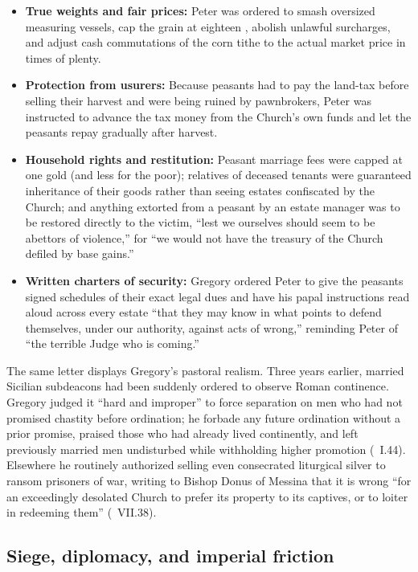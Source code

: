 \begin{itemize}
\item \textbf{True weights and fair prices:} Peter was ordered to smash
oversized measuring vessels, cap the grain  at eighteen
, abolish unlawful surcharges, and adjust cash commutations of
the corn tithe to the actual market price in times of plenty.
\item \textbf{Protection from usurers:} Because peasants had to pay the
 land-tax before selling their harvest and were being ruined by
pawnbrokers, Peter was instructed to advance the tax money from the Church's
own funds and let the peasants repay gradually after harvest.
\item \textbf{Household rights and restitution:} Peasant marriage fees were
capped at one gold  (and less for the poor); relatives of
deceased tenants were guaranteed inheritance of their goods rather than seeing
estates confiscated by the Church; and anything extorted from a peasant by an
estate manager was to be restored directly to the victim, ``lest we ourselves
should seem to be abettors of violence,'' for ``we would not have the treasury
of the Church defiled by base gains.''
\item \textbf{Written charters of security:} Gregory ordered Peter to give the
peasants signed schedules of their exact legal dues and have his papal
instructions read aloud across every estate ``that they may know in what
points to defend themselves, under our authority, against acts of wrong,''
reminding Peter of ``the terrible Judge who is coming.''
\end{itemize}

The same letter displays Gregory's pastoral realism. Three years earlier,
married Sicilian subdeacons had been suddenly ordered to observe Roman
continence. Gregory judged it ``hard and improper'' to force separation on men
who had not promised chastity before ordination; he forbade any future
ordination without a prior promise, praised those who had already lived
continently, and left previously married men undisturbed while withholding
higher promotion (\ I.44). Elsewhere he routinely authorized selling
even consecrated liturgical silver to ransom prisoners of war, writing to
Bishop Donus of Messina that it is wrong ``for an exceedingly desolated Church
to prefer its property to its captives, or to loiter in redeeming them''
(\ VII.38).

\subsection{Siege, diplomacy, and imperial friction}

